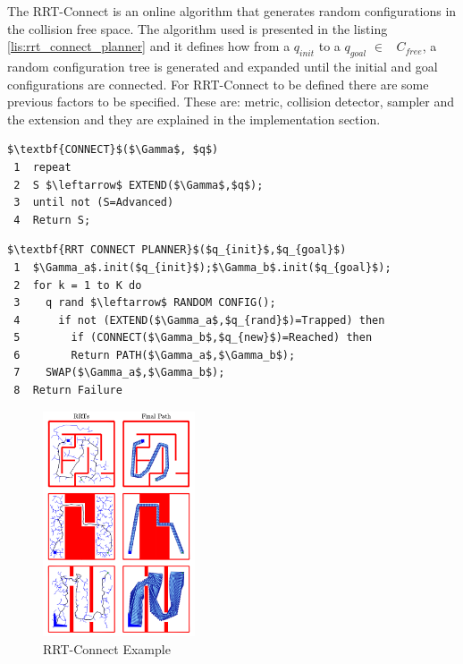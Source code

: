 The RRT-Connect is an online algorithm that generates random configurations in the collision free space.
The algorithm used is presented in the listing \ref{lis:rrt_connect_planner} and it defines how from a $q_{init}$ to a $q_{goal}$ $\in$ \ $C_{free}$, a random configuration tree is generated and expanded until the initial and goal configurations are connected. For RRT-Connect to be defined there are some previous factors to be specified. These are: metric, collision detector, sampler and the extension and they are explained in the implementation section.

\begin{lstlisting}[frame=tb, mathescape=true, xleftmargin=.28\textwidth, xrightmargin=.28\textwidth,caption=RRT-Connect Algorithm, label=lis:rrt_connect_planner]
$\textbf{CONNECT}$($\Gamma$, $q$)
 1  repeat 
 2  S $\leftarrow$ EXTEND($\Gamma$,$q$);
 3  until not (S=Advanced)
 4  Return S;
\end{lstlisting}
\lstset{}

\begin{lstlisting}[frame=tb, mathescape=true,xleftmargin=.13\textwidth, xrightmargin=.13\textwidth]
$\textbf{RRT CONNECT PLANNER}$($q_{init}$,$q_{goal}$)
 1  $\Gamma_a$.init($q_{init}$);$\Gamma_b$.init($q_{goal}$);
 2  for k = 1 to K do
 3    q rand $\leftarrow$ RANDOM CONFIG();
 4      if not (EXTEND($\Gamma_a$,$q_{rand}$)=Trapped) then
 5        if (CONNECT($\Gamma_b$,$q_{new}$)=Reached) then
 6        Return PATH($\Gamma_a$,$\Gamma_b$);
 7    SWAP($\Gamma_a$,$\Gamma_b$);
 8  Return Failure
\end{lstlisting}

\begin{figure}[!ht]
	\centering
	\includegraphics[width=0.4\textwidth]{figures/rrt_connect}
	\caption{RRT-Connect Example}
	\label{fig:rrt_connect}
\end{figure}

